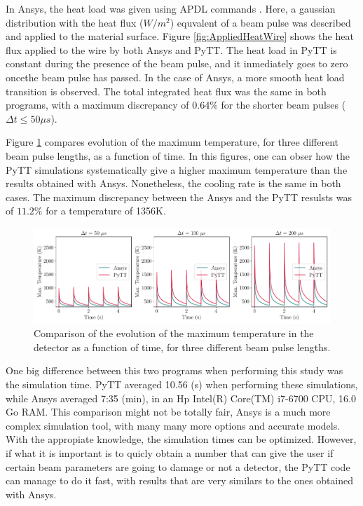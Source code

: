In Ansys, the heat load was given using APDL commands \parencite[][]{ref:APDLCommand}. Here, a gaussian distribution with the heat flux ($W/m^2$) equvalent of a beam pulse was described and applied to the material surface. Figure \ref{fig:AppliedHeatWire} shows the heat flux applied to the wire by both Ansys and PyTT. The heat load in PyTT is constant during the presence of the beam pulse, and it inmediately goes to zero oncethe beam pulse has passed. In the case of Ansys, a more smooth heat load transition is observed. The total integrated heat flux was the same in both programs, with a maximum discrepancy of $0.64\%$ for the shorter beam pulses ($\Delta t \leq 50\mu s$). 

Figure \ref{fig:TemperatureComparison} compares evolution of the maximum temperature, for three different beam pulse lengths, as a function of time. In this figures, one can obser how the PyTT simulations systematically give a higher maximum temperature than the results obtained with Ansys. Nonetheless, the cooling rate is the same in both cases. The maximum discrepancy between the Ansys and the PyTT resulsts was of $11.2\%$ for a temperature of 1356K.

\begin{figure}[h]
    \centering
    \includegraphics[width=1.0\columnwidth]{TempCompa/TempCompa.pdf}
    \caption{Comparison of the evolution of the maximum temperature in the detector as a function of time, for three different beam pulse lengths.}
    \label{fig:TemperatureComparison}
\end{figure}

One big difference between this two programs when performing this study was the simulation time. PyTT averaged 10.56 (s) when performing these simulations, while Ansys averaged 7:35 (min), in an Hp Intel(R) Core(TM) i7-6700 CPU, 16.0 Go RAM. This comparison might not be totally fair, Ansys is a much more complex simulation tool, with many many more options and accurate models. With the appropiate knowledge, the simulation times can be optimized. However, if what it is important is to quicly obtain a number that can give the user if certain beam parameters are going to damage or not a detector, the PyTT code can manage to do it fast, with results that are very similars to the ones obtained with Ansys. 

